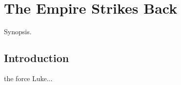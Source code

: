 
\chapter{The Empire Strikes Back}
	\label{chapter:empire-strikes-back}%



\begin{synopsis}
	Synopsis.
\end{synopsis}


\section{Introduction}

 the force Luke...


